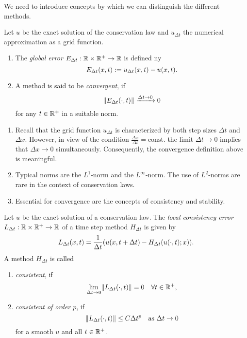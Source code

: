 We need to introduce concepts by which we can distinguish the different methods.

\begin{definition}
	Let \(u\) be the exact solution of the conservation law and \(u_{\Delta t}\) the numerical approximation as a grid function.
	\begin{enumerate}
		\item The \emph{global error} \(E_{\Delta t}: \mathbb{R} \times \mathbb{R}^+ \to \mathbb{R}\) is defined ny
		\[
			E_{\Delta t}\parentheses*{x, t} := u_{\Delta t}\parentheses*{x, t} - u\parentheses*{x, t}.
		\]
		\item A method is said to be \emph{convergent}, if
		\[
			\norm*{E_{\Delta t}\parentheses*{\cdot, t}} \xrightarrow{\Delta t \to 0} 0
		\]
		for any \(t \in \mathbb{R}^+\) in a suitable norm.
	\end{enumerate}
\end{definition}

\begin{remark}
	\begin{enumerate}
		\item Recall that the grid function \(u_{\Delta t}\) is characterized by both step sizes \(\Delta t\) and \(\Delta x\).
		However, in view of the condition \(\frac{\Delta x}{\Delta t} = \text{const.}\) the limit \(\Delta t \to 0\) implies that \(\Delta x \to 0\) simultaneously.
		Consequently, the convergence definition above is meaningful.
		\item Typical norms are the \(L^1\)-norm and the \(L^\infty\)-norm.
		The use of \(L^2\)-norms are rare in the context of conservation laws.
		\item Essential for convergence are the concepts of consistency and stability.
	\end{enumerate}
\end{remark}

\begin{definition}[Consistency]
	Let \(u\) be the exact solution of a conservation law.
	The \emph{local consistency error} \(L_{\Delta t}: \mathbb{R} \times \mathbb{R}^+ \to \mathbb{R}\) of a time step method \(H_{\Delta t}\) is given by
	\[
		L_{\Delta t}\parentheses*{x, t} = \frac{1}{\Delta t}\parentheses*{u\parentheses*{x, t + \Delta t} - H_{\Delta t}\parentheses*{u\parentheses*{\cdot, t}; x}}.
	\]
	A method \(H_{\Delta t}\) is called
	\begin{enumerate}
		\item \emph{consistent}, if
		\[
			\lim_{\Delta t \to 0}\norm*{L_{\Delta t}\parentheses*{\cdot, t}} = 0 \quad \forall t \in \R^+,
		\]
		\item \emph{consistent of order \(p\)}, if
		\[
			\norm*{L_{\Delta t}\parentheses*{\cdot, t}} \le C\Delta t^p \quad \text{as }\Delta t \to 0
		\]
		for a smooth \(u\) and all \(t \in \mathbb{R}^+\).
	\end{enumerate}
\end{definition}

